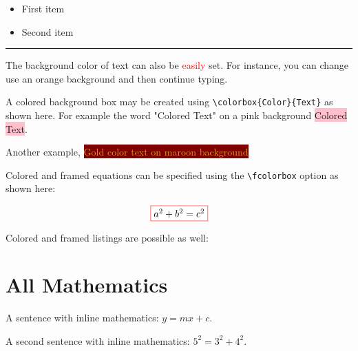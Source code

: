 \documentclass[12]{article}
\begin{document}
    \begin{itemize}
    \color{ForestGreen}
    \item First item
    \item Second item
    \end{itemize}
    
    \noindent
    {\color{RubineRed} \rule{\linewidth}{0.5mm}}

    The background color of text can also be \textcolor{red}{easily} set. For instance, you can change use an \colorbox{BurntOrange}{orange background} and then continue typing.

    A colored background box may be created using \verb|\colorbox{Color}{Text}| as shown here.
    For example the word "Colored Text" on a pink background \colorbox{pink}{Colored Text}.

    Another example, \colorbox{Maroon}{\textcolor{Goldenrod}{Gold color text on maroon background}}

    
    Colored and framed equations can be specified using the \verb|\fcolorbox| option as shown here:

    \[
    \fcolorbox{red}{white}{$a^{2} + b^{2} = c^{2}$}
    \]

    Colored and framed listings are possible as well:




    \section{All Mathematics}%
    \label{sec:All Mathematics}
    
    A sentence with inline mathematics: $y = mx + c$.

    A second sentence with inline mathematics: $5^{2}=3^{2}+4^{2}$.
\end{document}
